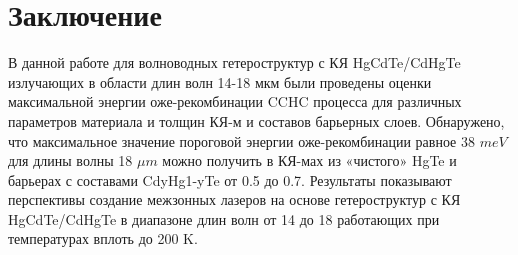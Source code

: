 \documentclass[../main.tex]{subfiles}
\begin{document}
    \chapter{Заключение}

    В данной работе для волноводных гетероструктур с КЯ HgCdTe/CdHgTe излучающих в области длин волн 14-18 мкм были проведены оценки максимальной
    энергии оже-рекомбинации CCHC процесса для различных параметров материала и толщин КЯ-м и составов барьерных слоев. Обнаружено, что 
    максимальное значение пороговой энергии оже-рекомбинации равное 38 $meV$ для длины волны 18 $\mu m$ можно получить в КЯ-мах из «чистого»  
    HgTe и барьерах с составами  CdyHg1-yTe от 0.5 до 0.7.  Результаты показывают перспективы создание межзонных лазеров на основе  гетероструктур с 
    КЯ HgCdTe/CdHgTe в диапазоне длин волн от 14 до 18 работающих при температурах вплоть до 200 K. 
\end{document}

